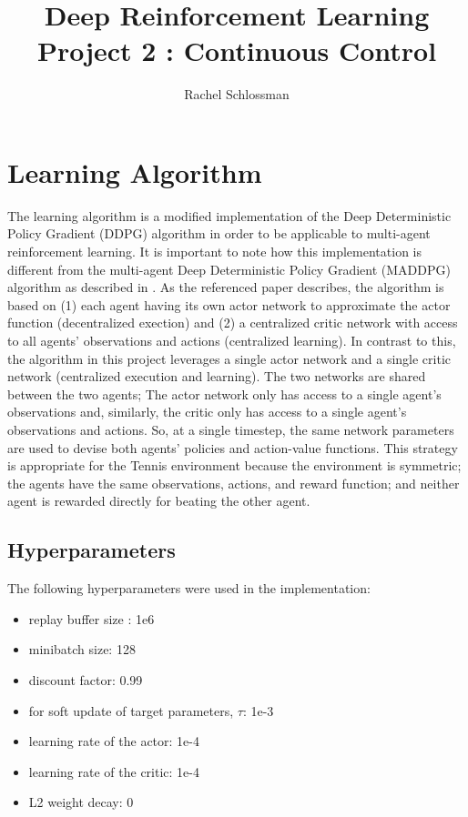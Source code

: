 \documentclass{article}
\begin{document}
\title{Deep Reinforcement Learning Project 2 : Continuous Control}
\author{Rachel Schlossman}

\maketitle

\section{Learning Algorithm}
The learning algorithm is a modified implementation of the Deep Deterministic Policy Gradient (DDPG) algorithm \cite{lillicrap2015continuous} in order to be applicable to multi-agent reinforcement learning. It is important to note how this implementation is different from the multi-agent Deep Deterministic Policy Gradient (MADDPG) algorithm as described in \cite{lowe2017multi}. As the referenced paper describes, the algorithm is based on (1) each agent having its own actor network to approximate the actor function (decentralized exection) and (2) a centralized critic network with access to all agents' observations and actions (centralized learning). In contrast to this, the algorithm in this project leverages a single actor network and a single critic network (centralized execution and learning). The two networks are shared between the two agents; The actor network only has access to a single agent's observations and, similarly, the critic only has access to a single agent's observations and actions. So, at a single timestep, the same network parameters are used to devise both agents' policies and action-value functions. This strategy is appropriate for the Tennis environment because the environment is symmetric; the agents have the same observations, actions, and reward function; and neither agent is rewarded directly for beating the other agent.


\subsection{Hyperparameters}
The following hyperparameters were used in the implementation:

\begin{itemize}
\item replay buffer size : 1e6
\item minibatch size: 128
\item discount factor: 0.99 
\item for soft update of target parameters, $\tau$: 1e-3
\item learning rate of the actor: 1e-4  
\item learning rate of the critic: 1e-4 
\item L2 weight decay: 0
\end{itemize}
\end{document}
